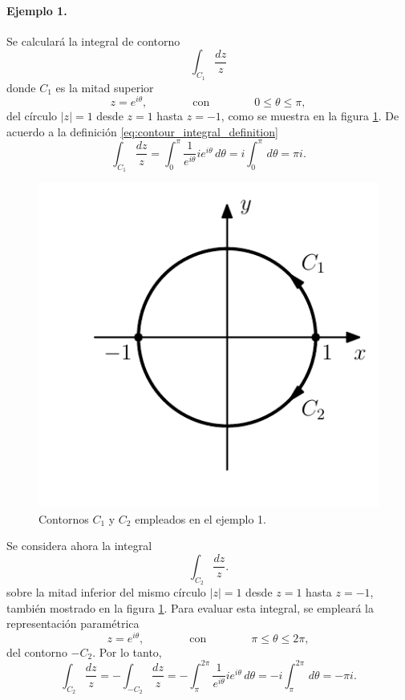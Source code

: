 \documentclass[a4paper]{report}
\begin{document}
\paragraph{Ejemplo 1.} Se calculará la integral de contorno
\[
 \int_{C_1}\frac{dz}{z}
\]
donde \(C_1\) es la mitad superior
\[
 z=e^{i\theta},\qquad\qquad\textrm{con}\qquad\qquad 0\leq\theta\leq\pi, 
\]
del círculo \(|z|=1\) desde \(z=1\) hasta \(z=-1\), como se muestra en la figura \ref{fig:example_45_01}. De acuerdo a la definición \ref{eq:contour_integral_definition}
\begin{equation}\label{eq:example_45_01_integral_c1}
 \int_{C_1}\frac{dz}{z}=\int_0^\pi\frac{1}{e^{i\theta}}ie^{i\theta}\,d\theta=i\int_0^\pi\,d\theta=\pi i. 
\end{equation}
\begin{figure}[!htb]
  \begin{minipage}[c]{0.35\textwidth}
    \includegraphics[width=\textwidth]{figuras/example_45_01.pdf}
  \end{minipage}\hfill
  \begin{minipage}[c]{0.55\textwidth}
    \caption{
        Contornos \(C_1\) y \(C_2\) empleados en el ejemplo 1.
    }\label{fig:example_45_01}
  \end{minipage}
\end{figure}

Se considera ahora la integral
\[
 \int_{C_2}\frac{dz}{z}.
\]
sobre la mitad inferior del mismo círculo \(|z|=1\) desde \(z=1\) hasta \(z=-1\), también mostrado en la figura \ref{fig:example_45_01}. Para evaluar esta integral, se empleará la representación paramétrica  
\[
 z=e^{i\theta},\qquad\qquad\textrm{con}\qquad\qquad \pi\leq\theta\leq2\pi, 
\]
del contorno \(-C_2\). Por lo tanto,
\begin{equation}\label{eq:example_45_01_integral_c2}
 \int_{C_2}\frac{dz}{z}=-\int_{-C_2}\frac{dz}{z}=-\int_\pi^{2\pi}\frac{1}{e^{i\theta}}ie^{i\theta}\,d\theta=-i\int_\pi^{2\pi}\,d\theta=-\pi i. 
\end{equation}
\end{document}
